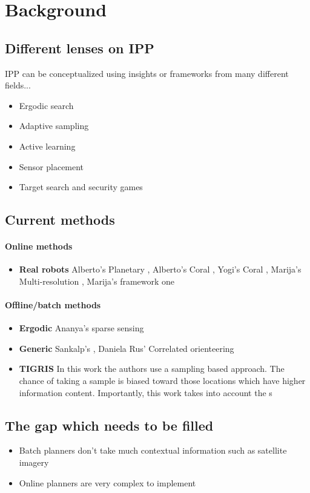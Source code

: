 
\chapter{Background} \label{chapBackground}

\section{Different lenses on IPP}
IPP can be conceptualized using insights or frameworks from many different fields...
\begin{itemize}
    \item Ergodic search
    \item Adaptive sampling
    \item Active learning 
    \item Sensor placement
    \item Target search and security games
\end{itemize}

\section{Current methods}
\subsubsection{Online methods}
\begin{itemize}
    \item \textbf{Real robots} Alberto's Planetary \cite{Kodgule2019Non-myopicMeasurements}, Alberto's Coral \cite{Candela2021}, Yogi's Coral \cite{Jamieson2020ActiveEnvironments}, Marija's Multi-resolution \cite{Stache2021AdaptiveSegmentation}, Marija's framework one \cite{Popovic2020}
\end{itemize}


\subsubsection{Offline/batch methods}
\begin{itemize}
    \item \textbf{Ergodic} Ananya's sparse sensing \cite{RaoSparseOptimization}
    \item \textbf{Generic} Sankalp's \cite{Arora2017RandomizedConstraints}, Daniela Rus' Correlated orienteering \cite{Yu2016CorrelatedTasks}
    \item \textbf{TIGRIS} \cite{Moon2022}
    In this work the authors use a sampling based approach. The chance of taking a sample is biased toward those locations which have higher information content. Importantly, this work takes into account the s
\end{itemize}

\section{The gap which needs to be filled}
\begin{itemize}
    \item Batch planners don't take much contextual information such as satellite imagery 
    \item Online planners are very complex to implement
\end{itemize}

